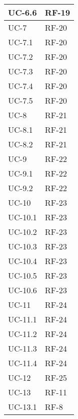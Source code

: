 \begin{longtable}{|>{\centering\arraybackslash}m{}|>{\centering\arraybackslash}m{}|}
	UC-6.6              & RF-19                   \\\hline
	UC-7                & RF-20                   \\\hline
	UC-7.1              & RF-20                   \\\hline
	UC-7.2              & RF-20                   \\\hline
	UC-7.3              & RF-20                   \\\hline
	UC-7.4              & RF-20                   \\\hline
	UC-7.5              & RF-20                   \\\hline
	UC-8                & RF-21                   \\\hline
	UC-8.1              & RF-21                   \\\hline
	UC-8.2              & RF-21                   \\\hline
	UC-9                & RF-22                   \\\hline
	UC-9.1              & RF-22                   \\\hline
	UC-9.2              & RF-22                   \\\hline
	UC-10               & RF-23                   \\\hline
	UC-10.1             & RF-23                   \\\hline
	UC-10.2             & RF-23                   \\\hline
	UC-10.3             & RF-23                   \\\hline
	UC-10.4             & RF-23                   \\\hline
	UC-10.5             & RF-23                   \\\hline
	UC-10.6             & RF-23                   \\\hline
	UC-11               & RF-24                   \\\hline
	UC-11.1             & RF-24                   \\\hline
	UC-11.2             & RF-24                   \\\hline
	UC-11.3             & RF-24                   \\\hline
	UC-11.4             & RF-24                   \\\hline
	UC-12               & RF-25                   \\\hline
	UC-13               & RF-11                   \\\hline
	UC-13.1             & RF-8                    \\\hline

\end{longtable}
